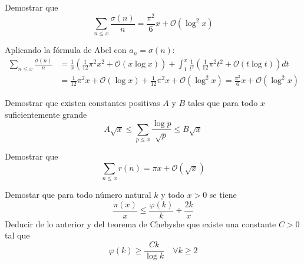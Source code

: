 \documentclass[twoside]{article}
\begin{document}
\begin{ejercicio}{8}
Demostrar que
\[ \sum_{n≤x} \frac{σ(n)}{n} = \frac{π^2}{6} x + \mathcal{O}(\log^2 x) \]
\end{ejercicio}
\begin{sol}
Aplicando la fórmula de Abel con $a_n = σ(n)$:
\begin{align*}
	\sum_{n≤x} \frac{σ(n)}{n} & = \frac{1}{x}\left(\frac{1}{12}π^2x^2 + \mathcal{O}(x \log x)\right) + \int_1^x \frac{1}{t^2}\left(\frac{1}{12}π^2t^2 + \mathcal{O}(t \log t)\right)dt\\
	& = \frac{1}{12}π^2x + \mathcal{O}(\log x) + \frac{1}{12}π^2x + \mathcal{O}(\log^2 x) = \frac{π^2}{6}x + \mathcal{O}(\log^2 x)
\end{align*}
\end{sol}

\newpage

\begin{ejercicio}{9}
Demostrar que existen constantes positivas $A$ y $B$ tales que para todo $x$ suficientemente grande
\[ A\sqrt{x} ≤ \sum_{p≤x} \frac{\log p}{\sqrt{p}} ≤ B \sqrt{x}\]
\end{ejercicio}
\begin{sol}
\end{sol}

\newpage

\begin{ejercicio}{10}
Demostrar que
\[ \sum_{n≤x} r(n) = πx + \mathcal{O}(\sqrt{x}) \]
\end{ejercicio}

\newpage

\begin{ejercicio}{11}
Demostar que para todo número natural $k$ y todo $x > 0$ se tiene
\[ \frac{π(x)}{x} ≤ \frac{φ(k)}{k} + \frac{2k}{x} \]
Deducir de lo anterior y del teorema de Chebyshe que existe una constante $C > 0$ tal que
\[ φ(k) ≥ \frac{Ck}{\log k} \quad \forall k≥2 \]
\end{ejercicio}

\newpage
\end{document}
